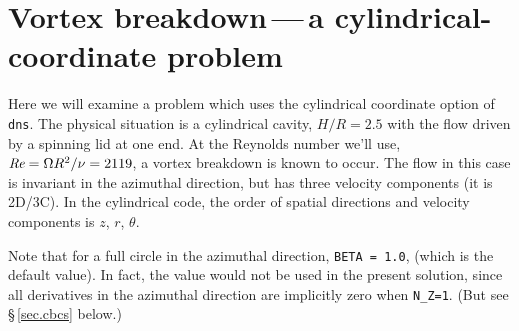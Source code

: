 \documentclass[11pt,a4paper]{report}
\def\Rey{\mbox{\it Re}}                             %
\begin{document}
\section{Vortex breakdown\,---\,a cylindrical-coordinate problem}

Here we will examine a problem which uses the cylindrical coordinate
option of \verb+dns+.  The physical situation is a cylindrical cavity,
$H/R=2.5$ with the flow driven by a spinning lid at one end.  At the
Reynolds number we'll use, $\Rey=\Omega R^2/\nu=2119$, a vortex
breakdown is known to occur.  The flow in this case is invariant in
the azimuthal direction, but has three velocity components (it is
2D/3C).  In the cylindrical code, the order of spatial directions and
velocity components is $z$, $r$, $\theta$.

Note that for a full circle in the azimuthal direction, \texttt{BETA =
  1.0}, (which is the default value). In fact, the value would not be
used in the present solution, since all derivatives in the azimuthal
direction are implicitly zero when \verb+N_Z=1+. (But see
\S\,\ref{sec.cbcs} below.)
\end{document}
